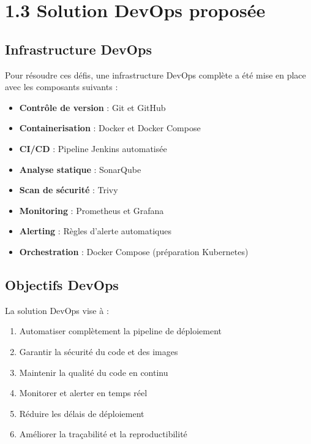 \documentclass[12pt,a4paper]{report}
\begin{document}
\section{1.3 Solution DevOps proposée}

\subsection{Infrastructure DevOps}

Pour résoudre ces défis, une infrastructure DevOps complète a été mise en place avec les composants suivants :

\begin{itemize}
    \item \textbf{Contrôle de version} : Git et GitHub
    \item \textbf{Containerisation} : Docker et Docker Compose
    \item \textbf{CI/CD} : Pipeline Jenkins automatisée
    \item \textbf{Analyse statique} : SonarQube
    \item \textbf{Scan de sécurité} : Trivy
    \item \textbf{Monitoring} : Prometheus et Grafana
    \item \textbf{Alerting} : Règles d'alerte automatiques
    \item \textbf{Orchestration} : Docker Compose (préparation Kubernetes)
\end{itemize}

\subsection{Objectifs DevOps}

La solution DevOps vise à :

\begin{enumerate}
    \item Automatiser complètement la pipeline de déploiement
    \item Garantir la sécurité du code et des images
    \item Maintenir la qualité du code en continu
    \item Monitorer et alerter en temps réel
    \item Réduire les délais de déploiement
    \item Améliorer la traçabilité et la reproductibilité
\end{enumerate}

\newpage
\end{document}
